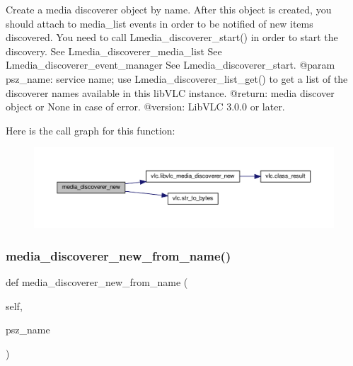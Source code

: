 \begin{DoxyVerb}Create a media discoverer object by name.
After this object is created, you should attach to media_list events in
order to be notified of new items discovered.
You need to call L{media_discoverer_start}() in order to start the
discovery.
See L{media_discoverer_media_list}
See L{media_discoverer_event_manager}
See L{media_discoverer_start}.
@param psz_name: service name; use L{media_discoverer_list_get}() to get a list of the discoverer names available in this libVLC instance.
@return: media discover object or None in case of error.
@version: LibVLC 3.0.0 or later.
\end{DoxyVerb}
 Here is the call graph for this function\+:
\nopagebreak
\begin{figure}[H]
\begin{center}
\leavevmode
\includegraphics[width=350pt]{classvlc_1_1_instance_ac61d7656e60513812c564af4487dcb67_cgraph}
\end{center}
\end{figure}
\mbox{\label{classvlc_1_1_instance_a177b455743be628db069909aa98c83d6}} 
\subsubsection{\texorpdfstring{media\+\_\+discoverer\+\_\+new\+\_\+from\+\_\+name()}{media\_discoverer\_new\_from\_name()}}
{\footnotesize\ttfamily def media\+\_\+discoverer\+\_\+new\+\_\+from\+\_\+name (\begin{DoxyParamCaption}\item[{}]{self,  }\item[{}]{psz\+\_\+name }\end{DoxyParamCaption})}

